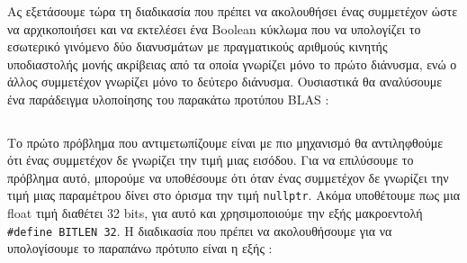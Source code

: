 Ας εξετάσουμε τώρα τη διαδικασία που πρέπει να ακολουθήσει ένας συμμετέχον ώστε να αρχικοποιήσει και να εκτελέσει ένα Boolean κύκλωμα που να υπολογίζει το εσωτερικό γινόμενο δύο διανυσμάτων με πραγματικούς αριθμούς κινητής υποδιαστολής μονής ακρίβειας από τα οποία γνωρίζει μόνο το πρώτο διάνυσμα, ενώ ο άλλος συμμετέχον γνωρίζει μόνο το δεύτερο διάνυσμα. Ουσιαστικά θα αναλύσουμε ένα παράδειγμα υλοποίησης του παρακάτω προτύπου BLAS :

\begin{figure}[h!]
    \begin{center}
        \inputminted[fontsize=\scriptsize,frame=single]{cpp}{./01_body/code/aby-example-step-0.cpp}
    \end{center}
\end{figure}

Το πρώτο πρόβλημα που αντιμετωπίζουμε είναι με πιο μηχανισμό θα αντιληφθούμε ότι ένας συμμετέχον δε γνωρίζει την τιμή μιας εισόδου. Για να επιλύσουμε το πρόβλημα αυτό, μπορούμε να υποθέσουμε ότι όταν ένας συμμετέχον δε γνωρίζει την τιμή μιας παραμέτρου δίνει στο όρισμα την τιμή \texttt{nullptr}. Ακόμα υποθέτουμε πως μια float τιμή διαθέτει 32 bits, για αυτό και χρησιμοποιούμε την εξής μακροεντολή \texttt{#define BITLEN 32}. Η διαδικασία που πρέπει να ακολουθήσουμε για να υπολογίσουμε το παραπάνω πρότυπο είναι η εξής :

